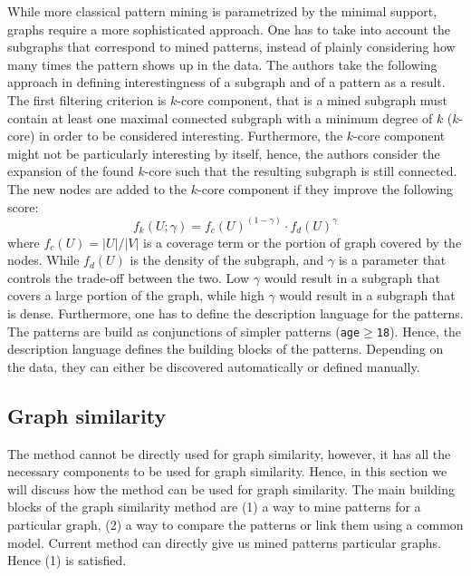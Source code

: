 \documentclass{article}
\begin{document}
While more classical pattern mining is parametrized by the minimal support, graphs require a more sophisticated approach. One has to take into account the subgraphs that correspond to mined patterns, instead of plainly considering how many times the pattern shows up in the data. The authors take the following approach in defining interestingness of a subgraph and of a pattern as a result. The first filtering criterion is $k$-core component, that is a mined subgraph must contain at least one maximal connected subgraph with a minimum degree of $k$ ($k$-core) in order to be considered interesting. Furthermore, the $k$-core component might not be particularly interesting by itself, hence, the authors consider the expansion of the found $k$-core such that the resulting subgraph is still connected. The new nodes are added to the $k$-core component if they improve the following score:
\[ f_k(U;\gamma) = f_c(U)^{(1-\gamma)} \cdot f_d(U)^{\gamma} \]
where $f_c(U) = |U|/|V|$ is a coverage term or  the portion of graph covered by the nodes. While $f_d(U)$ is the density of the subgraph, and $\gamma$ is a parameter that controls the trade-off between the two. Low $\gamma$ would result in a subgraph that covers a large portion of the graph, while high $\gamma$ would result in a subgraph that is dense. Furthermore, one has to define the description language for the patterns. The patterns are build as conjunctions of simpler patterns (\texttt{age$\geq$18}). Hence, the description language defines the building blocks of the patterns. Depending on the data, they can either be discovered automatically or defined manually.

\subsection{Graph similarity}
The method cannot be directly used for graph similarity, however, it has all the necessary components to be used for graph similarity. Hence, in this section we will discuss how the method can be used for graph similarity. The main building blocks of the graph similarity method are (1) a way to mine patterns for a particular graph, (2) a way to compare the patterns or link them using a common model. Current method can directly give us mined patterns particular graphs. Hence (1) is satisfied.
\end{document}
